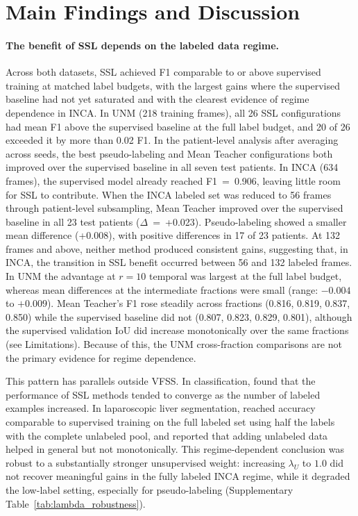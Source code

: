 \documentclass[a4paper,fleqn]{cas-dc}
\begin{document}
\FloatBarrier
\section{Main Findings and Discussion}
\label{sec:discussion}

\paragraph{The benefit of SSL depends on the labeled data regime.}
Across both datasets, SSL achieved F1 comparable to or above supervised training at matched label budgets, with the largest gains where the supervised baseline had not yet saturated and with the clearest evidence of regime dependence in INCA.
In UNM (218 training frames), all 26 SSL configurations had mean F1 above the supervised baseline at the full label budget, and 20 of 26 exceeded it by more than 0.02 F1. In the patient-level analysis after averaging across seeds, the best pseudo-labeling and Mean Teacher configurations both improved over the supervised baseline in all seven test patients.
In INCA (634 frames), the supervised model already reached F1~=~0.906, leaving little room for SSL to contribute.
When the INCA labeled set was reduced to 56 frames through patient-level subsampling, Mean Teacher improved over the supervised baseline in all 23 test patients ($\Delta$~=~+0.023). Pseudo-labeling showed a smaller mean difference (+0.008), with positive differences in 17 of 23 patients. At 132 frames and above, neither method produced consistent gains, suggesting that, in INCA, the transition in SSL benefit occurred between 56 and 132 labeled frames.
In UNM the advantage at $r{=}10$ temporal was largest at the full label budget, whereas mean differences at the intermediate fractions were small (range: $-0.004$ to $+0.009$). Mean Teacher's F1 rose steadily across fractions (0.816, 0.819, 0.837, 0.850) while the supervised baseline did not (0.807, 0.823, 0.829, 0.801), although the supervised validation IoU did increase monotonically over the same fractions (see Limitations). Because of this, the UNM cross-fraction comparisons are not the primary evidence for regime dependence.

This pattern has parallels outside VFSS. In classification, \citet{ref_oliver2018} found that the performance of SSL methods tended to converge as the number of labeled examples increased. In laparoscopic liver segmentation, \citet{ref_fu2019} reached accuracy comparable to supervised training on the full labeled set using half the labels with the complete unlabeled pool, and reported that adding unlabeled data helped in general but not monotonically.
This regime-dependent conclusion was robust to a substantially stronger unsupervised weight: increasing $\lambda_U$ to $1.0$ did not recover meaningful gains in the fully labeled INCA regime, while it degraded the low-label setting, especially for pseudo-labeling (Supplementary Table~\ref{tab:lambda_robustness}).
\end{document}
